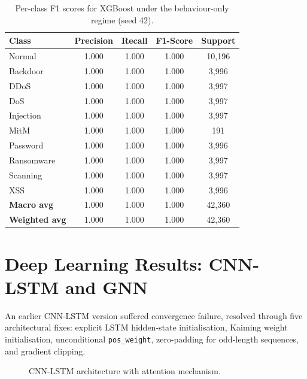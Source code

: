 \documentclass[12pt,a4paper]{report}
\begin{document}
\begin{table}[H]
\centering
\caption{Per-class F1 scores for XGBoost under the behaviour-only regime (seed 42).}
\label{tab:perclass-f1}
\begin{tabular}{lcccc}
\toprule
\textbf{Class} & \textbf{Precision} & \textbf{Recall} & \textbf{F1-Score} & \textbf{Support} \\
\midrule
Normal & 1.000 & 1.000 & 1.000 & 10,196 \\
Backdoor & 1.000 & 1.000 & 1.000 & 3,996 \\
DDoS & 1.000 & 1.000 & 1.000 & 3,997 \\
DoS & 1.000 & 1.000 & 1.000 & 3,997 \\
Injection & 1.000 & 1.000 & 1.000 & 3,997 \\
MitM & 1.000 & 1.000 & 1.000 & 191 \\
Password & 1.000 & 1.000 & 1.000 & 3,996 \\
Ransomware & 1.000 & 1.000 & 1.000 & 3,997 \\
Scanning & 1.000 & 1.000 & 1.000 & 3,997 \\
XSS & 1.000 & 1.000 & 1.000 & 3,996 \\
\midrule
\textbf{Macro avg} & 1.000 & 1.000 & 1.000 & 42,360 \\
\textbf{Weighted avg} & 1.000 & 1.000 & 1.000 & 42,360 \\
\bottomrule
\end{tabular}
\end{table}

\section{Deep Learning Results: CNN-LSTM and GNN}
\label{sec:cnnlstm-results}

An earlier CNN-LSTM version suffered convergence failure, resolved through five architectural fixes: explicit LSTM hidden-state initialisation, Kaiming weight initialisation, unconditional \texttt{pos\_weight}, zero-padding for odd-length sequences, and gradient clipping.

\begin{figure}[htbp]
\centering
{}
\caption{CNN-LSTM architecture with attention mechanism.}
\label{fig:cnn-lstm-arch}
\end{figure}
\end{document}
